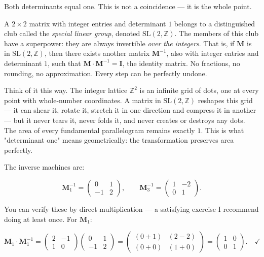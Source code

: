 Both determinants equal one. This is not a coincidence --- it is the whole point.

A $2 \times 2$ matrix with integer entries and determinant $1$ belongs to a distinguished club called the \textit{special linear group}, denoted $\mathrm{SL}(2, \mathbb{Z})$. The members of this club have a superpower: they are always invertible \textit{over the integers}. That is, if $\mathbf{M}$ is in $\mathrm{SL}(2, \mathbb{Z})$, then there exists another matrix $\mathbf{M}^{-1}$, also with integer entries and determinant $1$, such that $\mathbf{M} \cdot \mathbf{M}^{-1} = \mathbf{I}$, the identity matrix. No fractions, no rounding, no approximation. Every step can be perfectly undone.

Think of it this way. The integer lattice $\mathbb{Z}^2$ is an infinite grid of dots, one at every point with whole-number coordinates. A matrix in $\mathrm{SL}(2, \mathbb{Z})$ reshapes this grid --- it can shear it, rotate it, stretch it in one direction and compress it in another --- but it never tears it, never folds it, and never creates or destroys any dots. The area of every fundamental parallelogram remains exactly $1$. This is what "determinant one" means geometrically: the transformation preserves area perfectly.

The inverse machines are:

\[
\mathbf{M}_1^{-1} = \begin{pmatrix} 0 & 1 \\ -1 & 2 \end{pmatrix}, \qquad
\mathbf{M}_3^{-1} = \begin{pmatrix} 1 & -2 \\ 0 & 1 \end{pmatrix}.
\]

You can verify these by direct multiplication --- a satisfying exercise I recommend doing at least once. For $\mathbf{M}_1$:

\[
\mathbf{M}_1 \cdot \mathbf{M}_1^{-1} = \begin{pmatrix} 2 & -1 \\ 1 & 0 \end{pmatrix} \begin{pmatrix} 0 & 1 \\ -1 & 2 \end{pmatrix} = \begin{pmatrix} (0+1) & (2-2) \\ (0+0) & (1+0) \end{pmatrix} = \begin{pmatrix} 1 & 0 \\ 0 & 1 \end{pmatrix}. \quad \checkmark
\]

